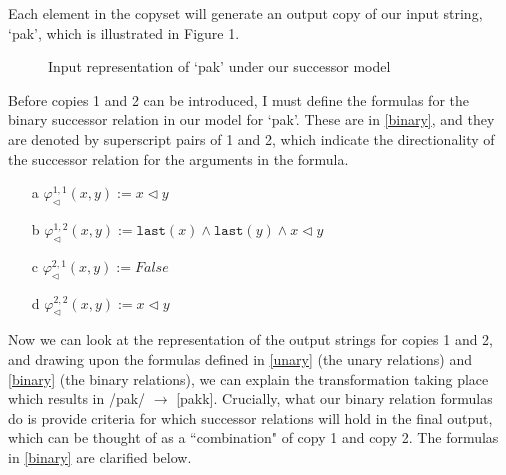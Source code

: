 \documentclass{article}
\begin{document}
Each element in the copyset will generate an output copy of our input string, ‘pak', which is illustrated in Figure 1.

\pagebreak

\begin{figure}
    \centering
    \caption{Input representation of ‘pak' under our successor model}
\end{figure}

Before copies 1 and 2 can be introduced, I must define the formulas for the binary successor relation in our model for ‘pak'. These are in \ref{binary}, and they are denoted by superscript pairs of 1 and 2, which indicate the directionality of the successor relation for the arguments in the formula.

\begin{exe}
    \ex
    \label{binary}
    \begin{itemize}
        \item [a] $\varphi_{\triangleleft}^{1,1}(x, y) := x \triangleleft y$
        \item [b] $\varphi_{\triangleleft}^{1,2}(x, y) := \texttt{last}(x) \wedge \texttt{last}(y) \wedge x \triangleleft y$
        \item [c] $\varphi_{\triangleleft}^{2,1}(x, y) := False$
        \item [d] $\varphi_{\triangleleft}^{2,2}(x, y) := x \triangleleft y$ 
    \end{itemize}
\end{exe}

Now we can look at the representation of the output strings for copies 1 and 2, and drawing upon the formulas defined in \ref{unary} (the unary relations) and \ref{binary} (the binary relations), we can explain the transformation taking place which results in /pak/ $\rightarrow$ [pakk]. Crucially, what our binary relation formulas do is provide criteria for which successor relations will hold in the final output, which can be thought of as a “combination" of copy 1 and copy 2. The formulas in \ref{binary} are clarified below.
\end{document}
